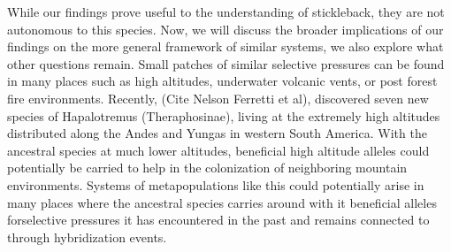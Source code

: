 \documentclass{article}
\begin{document}
While our findings prove useful to the understanding of stickleback, they are not autonomous to this species. 
Now, we will discuss the broader implications of our findings on the more general framework of similar systems, we also explore what other questions remain. 
Small patches of similar selective pressures can be found in many places such as high altitudes, underwater volcanic vents, or post forest fire environments. 
Recently, (Cite Nelson Ferretti et al), discovered seven new species of Hapalotremus (Theraphosinae), living at the extremely high altitudes distributed along the Andes and Yungas in western South America.
With the ancestral species at much lower altitudes, beneficial high altitude alleles could potentially be carried to help in the colonization of neighboring mountain environments. 
Systems of metapopulations like this could potentially arise in many places
where the ancestral species carries around with it beneficial alleles forselective pressures it has encountered in the past and remains connected to through hybridization events.
 
 
\end{document}
